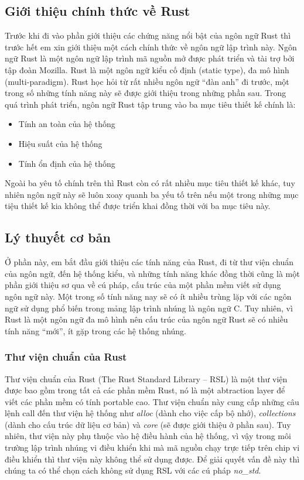\subsection{Giới thiệu chính thức về Rust}
Trước khi đi vào phần giới thiệu các chứng năng nổi bật của ngôn ngữ Rust thì trước hết em xin giới thiệu một cách chính thức về ngôn ngữ lập trình này.
Ngôn ngữ Rust là một ngôn ngữ lập trình mã nguồn mở được phát triển và tài trợ bởi tập đoàn Mozilla.
Rust là một ngôn ngữ kiểu cố định (static type), đa mô hình (multi-paradigm). \cite{ownership_semantics}
Rust học hỏi từ rất nhiều ngôn ngữ ``đàn anh'' đi trước, một trong số những tính năng này sẽ được giới thiệu trong những phần sau.
Trong quá trình phát triển, ngôn ngữ Rust tập trung vào ba mục tiêu thiết kế chính là:
\begin{itemize}
\item Tính an toàn của hệ thống
\item Hiệu suất của hệ thống
\item Tính ổn định của hệ thống
\end{itemize}
Ngoài ba yêu tố chính trên thì Rust còn có rất nhiều mục tiêu thiết kế khác, tuy nhiên ngôn ngữ này sẽ luôn xoay quanh ba yếu tố trên nếu một trong những mục tiệu thiết kế kia không thể được triển khai đồng thời với ba mục tiêu này.

\subsection{Lý thuyết cơ bản}
Ở phần này, em bắt đầu giới thiệu các tính năng của Rust, đi từ thư viện chuẩn của ngôn ngữ, đến hệ thống kiểu, và những tính năng khác đồng thời cũng là một phần giới thiệu sơ qua về cú pháp, cấu trúc của một phần mềm viết sử dụng ngôn ngữ này.
Một trong số tính năng nay sẽ có ít nhiều trùng lặp với các ngôn ngữ sử dụng phổ biến trong mảng lập trình nhúng là ngôn ngữ C.
Tuy nhiên, vì Rust là một ngôn ngữ đa mô hình nên cấu trúc của ngôn ngữ Rust sẽ có nhiều tính năng ``mới'', ít gặp trong các hệ thống nhúng.
\subsubsection{Thư viện chuẩn của Rust}
Thư viện chuẩn của Rust (The Rust Standard Library -- RSL) là một thư viện được bao gồm trong tất cả các phần mềm Rust, nó là một abtraction layer để viết các phần mềm có tính portable cao.
Thư viện chuẩn này cung cấp những câu lệnh call đến thư viện hệ thống như \emph{alloc} (dành cho việc cấp bộ nhớ), \emph{collections} (dành cho cấu trúc dữ liệu cơ bản) và \emph{core} (sẽ được giới thiệu ở phần sau).
Tuy nhiên, thư viện này phụ thuộc vào hệ điều hành của hệ thống, vì vậy trong môi trường lập trình nhúng vi điều khiển khi mà mã nguồn chạy trực tiếp trên chip vi điều khiển thì thư viện này không thể sử dụng được.
Để giải quyết vấn đề này thì chúng ta có thể chọn cách không sử dụng RSL với các cú pháp \emph{no\_std}.

